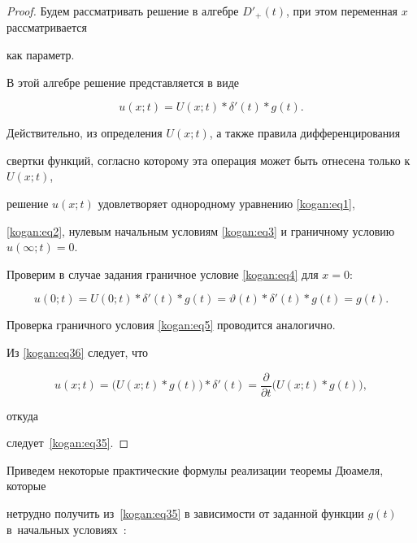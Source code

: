 \smallskip



\begin{proof} Будем рассматривать решение в алгебре $D'_+(t)$, при этом переменная $x$ рассматривается 

как параметр. 

В этой алгебре решение представляется в виде 

\begin{equation}

\label{kogan:eq36}

u(x;t)=U(x;t)\ast \delta'(t)\ast g(t).

\end{equation}



Действительно, из определения $U(x;t)$, а также правила дифференцирования 

свертки функций, согласно которому эта операция может быть отнесена только к~$U(x;t)$, 

решение $u(x;t)$ удовлетворяет однородному уравнению \eqref{kogan:eq1}, 

\eqref{kogan:eq2}, нулевым начальным условиям \eqref{kogan:eq3} и граничному условию $u(\infty ;t)=0$. 



Проверим в случае задания граничное условие \eqref{kogan:eq4} для $x=0$: 

$$u(0;t)=U(0;t)\ast \delta'(t)\ast g(t)=\vartheta (t)\ast \delta'(t)\ast 

g(t)=g(t).$$ 



Проверка граничного условия \eqref{kogan:eq5} проводится аналогично. 



Из \eqref{kogan:eq36} следует, что 

$$u(x;t)=\big( U(x;t)\ast g(t) \big)\ast \delta'

(t)=\frac{\partial }{\partial t} \bigl( U(x;t)\ast g(t)\bigr),$$ 

откуда 

следует~\eqref{kogan:eq35}.

\end{proof}



\smallskip



Приведем некоторые практические формулы реализации теоремы Дюамеля, которые 

нетрудно получить из~\eqref{kogan:eq35} в зависимости от заданной функции $g(t)$ в~начальных условиях~\cite{kogan:bib20}:

